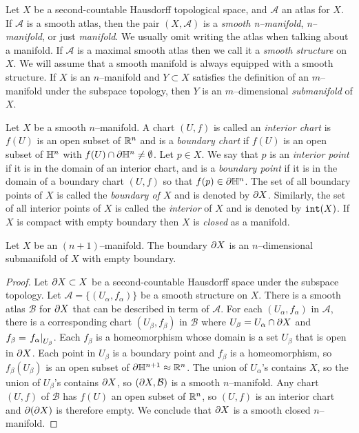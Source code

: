 \begin{defn}[Manifolds]
	\label{def:manifold}
	Let $X$ be a second-countable Hausdorff topological space, and $\mathcal{A}$ an atlas for $X$.
	If $\mathcal{A}$ is a smooth atlas, then the pair $(X,\mathcal{A})$ is a \emph{smooth n--manifold},  \emph{n--manifold}, or just \emph{manifold}.
	We usually omit writing the atlas when talking about a manifold.
	If $\mathcal{A}$ is a maximal smooth atlas then we call it a \emph{smooth structure} on $X$.
	We will assume that a smooth manifold is always equipped with a smooth structure.
	If $X$ is an $n$--manifold and $Y\subset X$ satisfies the definition of an $m$--manifold under the subspace topology, then $Y$ is an $m$--dimensional \emph{submanifold} of $X$.
\end{defn}

\begin{defn}	
	\label{def:boundary}
	Let $X$ be a smooth $n$--manifold.
	A chart $(U,f)$ is called an \emph{interior chart} is $f(U)$ is an open subset of $\mathbb{R}^n$ and is a \emph{boundary chart} if $f(U)$ is an open subset of $\mathbb{H}^n$ with $f(U)\cap\partial \mathbb{H}^n\neq\emptyset$.
	Let $p\in X$.
	We say that $p$ is an \emph{interior point} if it is in the domain of an interior chart, and is a \emph{boundary point} if it is in the domain of a boundary chart $(U,f)$ so that $f(p)\in\partial\mathbb{H}^n$.
	The set of all boundary points of $X$ is called the \emph{boundary of $X$} and is denoted by $\partial X$.
	Similarly, the set of all interior points of $X$ is called the \emph{interior} of $X$ and is denoted by $\mathtt{int}(X)$.
	If $X$ is compact with empty boundary then $X$ is \emph{closed} as a manifold.
\end{defn}

\begin{prop}
	\label{prop:boundariesaremanifolds}
	Let $X$ be an $(n+1)$--manifold.
	The boundary $\partial X$ is an $n$--dimensional submanifold of $X$ with empty boundary.
\end{prop}

\begin{proof}
	Let $\partial X\subset X$ be a second-countable Hausdorff space under the subspace topology.
	Let $\mathcal{A} = \{(U_\alpha, f_\alpha)\}$ be a smooth structure on $X$.
	There is a smooth atlas $\mathcal{B}$ for $\partial X$ that can be described in term of $\mathcal{A}$.
	For each $(U_\alpha,f_\alpha)$ in $\mathcal{A}$, there is a corresponding chart $(U_\beta,f_\beta)$ in $\mathcal{B}$ where $U_\beta = U_\alpha \cap \partial X$ and $f_\beta = \left.f_\alpha\right|_{U_\beta}$.
	Each $f_\beta$ is a homeomorphism whose domain is a set $U_\beta$ that is open in $\partial X$.
	Each point in $U_\beta$ is a boundary point and $f_\beta$ is a homeomorphism, so $f_\beta(U_\beta)$ is an open subset of $\partial \mathbb{H}^{n+1} \approx\mathbb{R}^n$.
	The union of $U_\alpha$'s contains $X$, so the union of $U_\beta$'s contains $\partial X$, so $(\partial X, \mathcal{B})$ is a smooth $n$--manifold.
	Any chart $(U,f)$ of $\mathcal{B}$ has $f(U)$ an open subset of $\mathbb{R}^n$, so $(U,f)$ is an interior chart and $\partial(\partial X)$ is therefore empty.
	We conclude that $\partial X$ is a smooth closed $n$--manifold. 
\end{proof}

